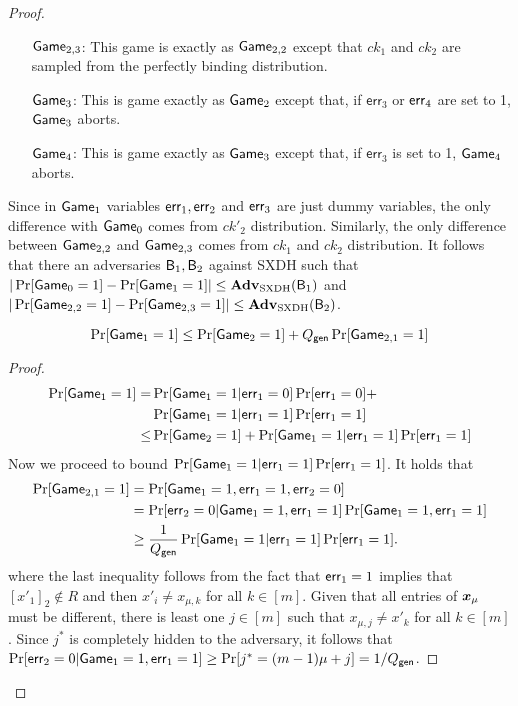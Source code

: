 \begin{proof}
\begin{itemize}
\item[$\mathsf{Game}_{2,3}$:] This game is exactly as $\mathsf{Game}_{2,2}$ except that $ck_1$ and $ck_2$ are sampled from the perfectly binding distribution.
\item[$\mathsf{Game}_3$:] This is game exactly as $\mathsf{Game}_2$ except that, if $\mathsf{err}_3$ or $\mathsf{err}_4$ are set to 1, $\mathsf{Game}_3$ aborts.
\item[$\mathsf{Game}_4$:] This is game exactly as $\mathsf{Game}_3$ except that, if $\mathsf{err}_3$ is set to 1, $\mathsf{Game}_4$ aborts. 
\end{itemize}
Since in $\mathsf{Game}_1$ variables $\mathsf{err}_1,\mathsf{err}_2$ and $\mathsf{err}_3$ are just dummy variables, the only difference with $\mathsf{Game}_0$ comes from $ck'_2$ distribution. Similarly, the only difference between $\mathsf{Game}_{2,2}$ and $\mathsf{Game}_{2,3}$ comes from $ck_1$ and $ck_2$ distribution.
It follows that there an adversaries $\mathsf{B}_{1},\mathsf{B}_{2}$ against SXDH such that $|\Pr[\mathsf{Game}_0=1]-\Pr[\mathsf{Game}_1=1]|\leq \mathbf{Adv}_{\mathrm{SXDH}}(\mathsf{B}_{1})$ and $|\Pr[\mathsf{Game}_{2,2}=1]-\Pr[\mathsf{Game}_{2,3}=1]|\leq \mathbf{Adv}_{\mathrm{SXDH}}(\mathsf{B}_{2})$.

\begin{lemma} 
$$
\Pr[\mathsf{Game}_1=1]\leq \Pr[\mathsf{Game}_2=1] + Q_\mathsf{gen}\Pr[\mathsf{Game}_{2,1}=1]
$$
\end{lemma}
\begin{proof}
\begin{align*}
\Pr[\mathsf{Game}_1=1]
 = &\Pr[\mathsf{Game}_1=1|\mathsf{err}_1=0]\Pr[\mathsf{err}_1=0]+\\
&\Pr[\mathsf{Game}_1=1|\mathsf{err}_1=1]\Pr[\mathsf{err}_1=1]\\
 \leq& \Pr[\mathsf{Game}_2=1] + \Pr[\mathsf{Game}_1=1|\mathsf{err}_1=1]\Pr[\mathsf{err}_1=1]\\
\end{align*}
Now we proceed to bound $\Pr[\mathsf{Game}_1=1|\mathsf{err}_1=1]\Pr[\mathsf{err}_1=1]$. It holds that
\begin{align*}
\Pr[\mathsf{Game}_{2,1}=1] 
&= \Pr[\mathsf{Game}_1=1,\mathsf{err}_1=1,\mathsf{err}_2=0]\\
&= \Pr[\mathsf{err}_2=0|\mathsf{Game}_1=1,\mathsf{err}_1=1]\Pr[\mathsf{Game}_1 = 1,\mathsf{err}_1=1]\\
&\geq \frac{1}{Q_\mathsf{gen}}\Pr[\mathsf{Game}_1=1|\mathsf{err}_1=1]\Pr[\mathsf{err}_1=1].
\end{align*}
where the last inequality follows from the fact that $\mathsf{err}_1=1$ implies that $[x'_1]_2\notin R$ and then $x'_i \neq x_{\mu,k}$ for all $k\in [m]$. Given that all entries of ${\boldsymbol{x}}_\mu$ must be different, there is least one $j\in[m]$ such that $x_{\mu,j}\neq x'_k$ for all $k\in[m]$. Since $j^*$ is completely hidden to the adversary, it follows that $\Pr[\mathsf{err}_2=0|\mathsf{Game}_1=1,\mathsf{err}_1=1] \geq \Pr[j^*=(m-1)\mu+j] = 1/Q_\mathsf{gen}$.
\end{proof}


\end{proof}
